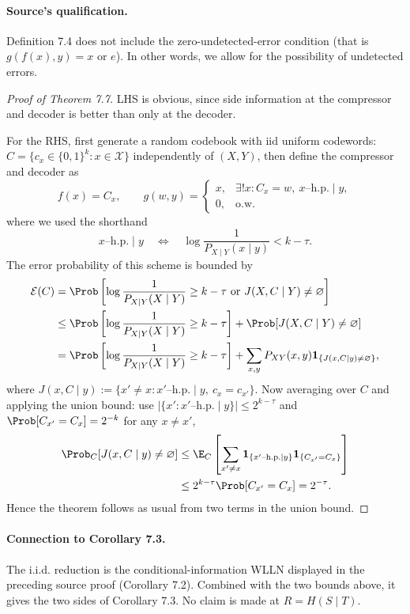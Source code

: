 \paragraph{Source's qualification.}
Definition 7.4 does not include the zero-undetected-error condition (that is $g(f(x),y)=x$ or $e$). In other words, we allow for the possibility of undetected errors.
\begin{proof}[Proof of Theorem 7.7]
LHS is obvious, since side information at the compressor and decoder is better than only at the decoder.

For the RHS, first generate a random codebook with iid uniform codewords:
$C=\{c_x\in\{0,1\}^k:x\in\mathcal X\}$ independently of $(X,Y)$, then define the compressor and decoder as
\[
f(x)=C_x,\qquad
 g(w,y)=\begin{cases}x,&\exists!x:C_x=w,\ x\text{--h.p.}\mid y,\\0,&\text{o.w.}\end{cases}
\]
where we used the shorthand
\[
x\text{--h.p.}\mid y\quad\Longleftrightarrow\quad
\log\frac1{P_{X\mid Y}(x\mid y)}<k-\tau.
\]
The error probability of this scheme is bounded by
\begin{align*}
\mathcal E(C)
&=\Prob\left[\log\frac1{P_{X\mid Y}(X\mid Y)}\ge k-\tau
\ \text{or }J(X,C\mid Y)\ne\varnothing\right]\\
&\le\Prob\left[\log\frac1{P_{X\mid Y}(X\mid Y)}\ge k-\tau\right]
+\Prob[J(X,C\mid Y)\ne\varnothing]\\
&=\Prob\left[\log\frac1{P_{X\mid Y}(X\mid Y)}\ge k-\tau\right]
+\sum_{x,y}P_{XY}(x,y)\mathbf1_{\{J(x,C\mid y)\ne\varnothing\}},
\end{align*}
where $J(x,C\mid y)\mathrel{:=}\{x'\ne x:x'\text{--h.p.}\mid y,\ c_x=c_{x'}\}$.
Now averaging over $C$ and applying the union bound: use
$|\{x':x'\text{--h.p.}\mid y\}|\le2^{k-\tau}$ and
$\Prob[C_{x'}=C_x]=2^{-k}$ for any $x\ne x'$,
\begin{align*}
\Prob_C[J(x,C\mid y)\ne\varnothing]
&\le\E_C\left[\sum_{x'\ne x}
\mathbf1_{\{x'\text{--h.p.}\mid y\}}\mathbf1_{\{C_{x'}=C_x\}}\right]\\
&\le2^{k-\tau}\Prob[C_{x'}=C_x]=2^{-\tau}.
\end{align*}
Hence the theorem follows as usual from two terms in the union bound.
\end{proof}
\paragraph{Connection to Corollary 7.3.}
The i.i.d. reduction is the conditional-information WLLN displayed in the preceding source proof (Corollary 7.2). Combined with the two bounds above, it gives the two sides of Corollary 7.3. No claim is made at $R=H(S\mid T)$.
